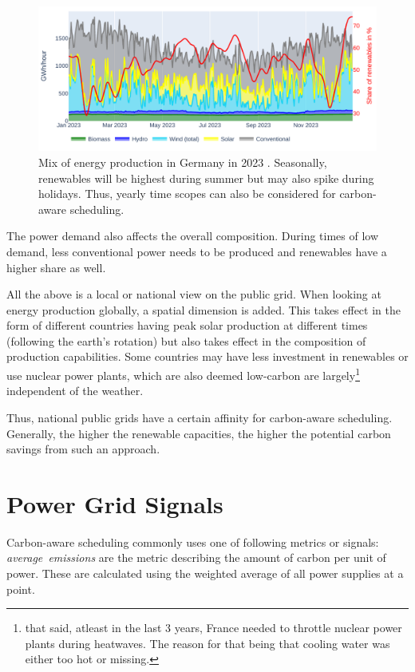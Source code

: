 \begin{figure}
    \includegraphics[width=\linewidth]{agorameter/energy_production_year.pdf}
    \caption[short]{Mix of energy production in Germany in 2023 . Seasonally, renewables will be highest during summer but may also spike during holidays. Thus, yearly time scopes can also be considered for carbon-aware scheduling.}
    \label{fig:energy_mix_year}
\end{figure}

The power demand also affects the overall composition. 
During times of low demand, less conventional power needs to be produced and renewables have a higher share as well.

All the above is a local or national view on the public grid. 
When looking at energy production globally, a spatial dimension is added. 
This takes effect in the form of different countries having peak solar production at different times (following the earth's rotation) but also takes effect in the composition of production capabilities.
Some countries may have less investment in renewables or use nuclear power plants, which are also deemed low-carbon are largely\footnote{that said, atleast in the last 3 years, France needed to throttle nuclear power plants during heatwaves.  The reason for that being that cooling water was either too hot or missing. } independent of the weather.

Thus, national public grids have a certain affinity for carbon-aware scheduling\cite{wiesner_lets_2021}. Generally, the higher the renewable capacities, the higher the potential carbon savings from such an approach. 

\section{Power Grid Signals}
Carbon-aware scheduling commonly uses one of following metrics or signals: \emph{average~emissions} are the metric describing the amount of carbon per unit of power. These are calculated using the weighted average of all power supplies at a point.

